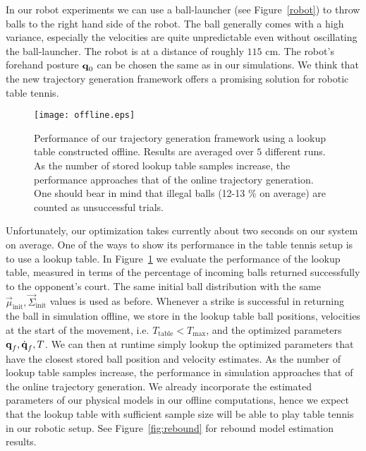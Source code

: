 In our robot experiments we can use a ball-launcher (see Figure~\ref{robot}) to throw balls to the right hand side of the robot. The ball generally comes with a high variance, especially the velocities are quite unpredictable even without oscillating the ball-launcher. The robot is at a distance of roughly $115$ cm. The robot's forehand posture $\boldsymbol{\mathrm{q}}_0$ can be chosen the same as in our simulations. We think that the new trajectory generation framework offers a promising solution for robotic table tennis. 

\begin{figure}[t!]
\centering
\texttt{[image: offline.eps]}	
\caption{Performance of our trajectory generation framework using a lookup table constructed offline. Results are averaged over $5$ different runs. As the number of stored lookup table samples increase, the performance approaches that of the online trajectory generation. One should bear in mind that illegal balls (12-13 \% on average) are counted as unsuccessful trials.}
\label{fig:offline}
\end{figure}

Unfortunately, our optimization takes currently about two seconds on our system on average. One of the ways to show its performance in the table tennis setup is to use a lookup table. In Figure~\ref{fig:offline} we evaluate the performance of the lookup table, measured in terms of the percentage of incoming balls returned successfully to the opponent's court. The same initial ball distribution with the same $\vec{\mu}_{\mathrm{init}}, \vec{\Sigma}_{\mathrm{init}}$ values is used as before. Whenever a strike is successful in returning the ball in simulation offline, we store in the lookup table ball positions, velocities at the start of the movement, i.e. $T_{\mathrm{table}} < T_{\mathrm{max}}$, and the optimized parameters $\boldsymbol{\mathrm{q}}_f, \dot{\boldsymbol{\mathrm{q}}}_f, T$. We can then at runtime simply lookup the optimized parameters that have the closest stored ball position and velocity estimates. As the number of lookup table samples increase, the performance in simulation approaches that of the online trajectory generation. We already incorporate the estimated parameters of our physical models in our offline computations, hence we expect that the lookup table with sufficient sample size will be able to play table tennis in our robotic setup. See Figure~\ref{fig:rebound} for rebound model estimation results.


